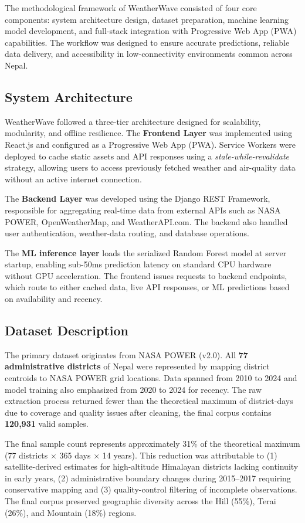 \documentclass[conference]{IEEEtran}
\begin{document}
The methodological framework of WeatherWave consisted of four core components: system architecture design, dataset preparation, machine learning model development, and full-stack integration with Progressive Web App (PWA) capabilities. The workflow was designed to ensure accurate predictions, reliable data delivery, and accessibility in low-connectivity environments common across Nepal.

\subsection{System Architecture}

WeatherWave followed a three-tier architecture designed for scalability, modularity, and offline resilience. The \textbf{Frontend Layer} was implemented using React.js and configured as a Progressive Web App (PWA). Service Workers were deployed to cache static assets and API responses using a \textit{stale-while-revalidate} strategy, allowing users to access previously fetched weather and air-quality data without an active internet connection.

The \textbf{Backend Layer} was developed using the Django REST Framework, responsible for aggregating real-time data from external APIs such as NASA POWER, OpenWeatherMap, and WeatherAPI.com. The backend also handled user authentication, weather-data routing, and database operations.

The \textbf{ML inference layer} loads the serialized Random Forest model at server startup, enabling sub-50ms prediction latency on standard CPU hardware without GPU acceleration. The frontend issues requests to backend endpoints, which route to either cached data, live API responses, or ML predictions based on availability and recency.
\subsection{Dataset Description}
 The primary dataset originates from NASA POWER (v2.0). All \textbf{77 administrative districts} of Nepal were represented by mapping district centroids to NASA POWER grid locations. Data spanned from 2010 to 2024 and model training also emphasized from 2020 to 2024 for recency. The raw extraction process returned fewer than the theoretical maximum of district-days due to coverage and quality issues after cleaning, the final corpus contains \textbf{120,931} valid samples.

 The final sample count represents approximately 31\% of the theoretical maximum (77 districts $\times$ 365 days $\times$ 14 years). This reduction was attributable to (1) satellite-derived estimates for high-altitude Himalayan districts lacking continuity in early years, (2) administrative boundary changes during 2015--2017 requiring conservative mapping and (3) quality-control filtering of incomplete observations. The final corpus preserved geographic diversity across the Hill (55\%), Terai (26\%), and Mountain (18\%) regions. 
\end{document}
